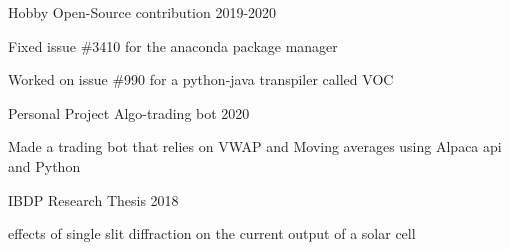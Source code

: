 




\begin{cventries}

   \cventry
        {Hobby}
        {Open-Source contribution}
        {}
        {2019-2020}
        {
            \begin{cvitems}
                \item{Fixed issue \#3410 for the anaconda package manager}
                \item{Worked on issue \#990 for a python-java transpiler called VOC}
            \end{cvitems}
        }
   
   
   \cventry
    {Personal Project} 
    {Algo-trading bot}
    {}
    {2020}
    {
        \begin{cvitems}
            \item{Made a trading bot that relies on VWAP and Moving averages using Alpaca api and Python}
        \end{cvitems}
    }
  
  
  \cventry
    {IBDP} 
    {Research Thesis}
    {}
    {2018}
    {
        \begin{cvitems}
            \item{effects of single slit diffraction on the current output of a solar cell}
        \end{cvitems}
    }

 
\end{cventries}


